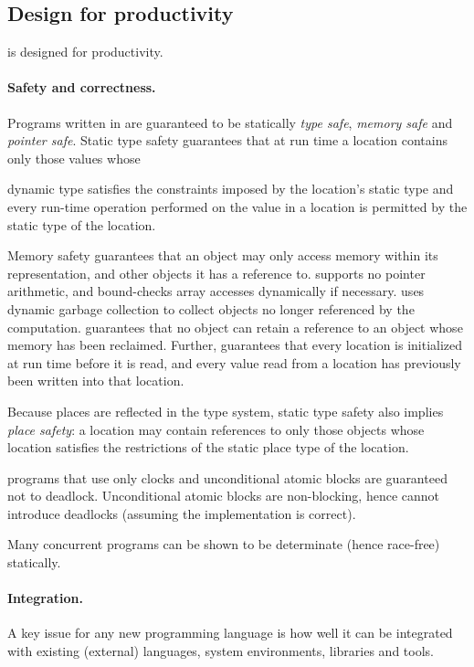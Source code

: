 \subsection{Design for productivity}
\Xten{} is designed for productivity. 

\paragraph{Safety and correctness.} 
Programs written in \Xten{} are guaranteed to be statically
\emph{type safe}, \emph{memory safe} and \emph{pointer safe}. Static type safety
guarantees that at run time a location contains only those values whose

dynamic type satisfies the constraints imposed by the location's
static type and every run-time operation performed on the value in a
location is permitted by the static type of the location.

Memory safety guarantees that an object may only access memory within
its representation, and other objects it has a reference to. \Xten{}
supports no pointer arithmetic, and bound-checks array accesses
dynamically if necessary. \Xten{} uses dynamic garbage collection to
collect objects no longer referenced by the computation. \Xten{}
guarantees that no object can retain a reference to an object
whose memory has been reclaimed.  Further, \Xten{} guarantees that
every location is initialized at run time before it is read, 
and every value read from a location has previously been written into
that location. 


Because places are reflected in the type system, static type safety
also implies \emph{place safety}: a location may contain references to only
those objects whose location satisfies the restrictions of the static
place type of the location.

\Xten{} programs that use only clocks and unconditional atomic
blocks are guaranteed not to deadlock. Unconditional atomic blocks
are non-blocking, hence cannot introduce deadlocks (assuming the
implementation is correct).

Many concurrent programs can be shown to be determinate (hence
race-free) statically.

\paragraph{Integration.}
A key issue for any new programming language is how well it can be
integrated with existing (external) languages, system environments,
libraries and tools.

